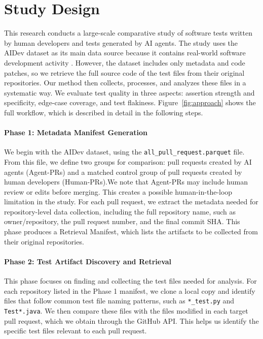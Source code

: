 \documentclass[conference]{IEEEtran}
\begin{document}
\section{Study Design}
\label{Section:Methodology} 
This research conducts a large-scale comparative study of software tests written by human developers and tests generated by AI agents. The study uses the AIDev dataset as its main data source because it contains real-world software development activity \cite{li2025riseaiteammatessoftware}. However, the dataset includes only metadata and code patches, so we retrieve the full source code of the test files from their original repositories. Our method then collects, processes, and analyzes these files in a systematic way. We evaluate test quality in three aspects: assertion strength and specificity, edge-case coverage, and test flakiness. Figure~\ref{fig:approach} shows the full workflow, which is described in detail in the following steps.

\paragraph{\textbf{Phase 1: Metadata Manifest Generation}}
We begin with the AIDev dataset, using the \texttt{all\_pull\_request.parquet} file. From this file, we define two groups for comparison: pull requests created by AI agents (Agent-PRs) and a matched control group of pull requests created by human developers (Human-PRs).We note that Agent-PRs may include human review or edits before merging. This creates a possible human-in-the-loop limitation in the study. For each pull request, we extract the metadata needed for repository-level data collection, including the full repository name, such as owner/repository, the pull request number, and the final commit SHA. This phase produces a Retrieval Manifest, which lists the artifacts to be collected from their original repositories.

\paragraph{\textbf{Phase 2: Test Artifact Discovery and Retrieval}}
This phase focuses on finding and collecting the test files needed for analysis. For each repository listed in the Phase 1 manifest, we clone a local copy and identify files that follow common test file naming patterns, such as \texttt{*\_test.py} and \texttt{Test*.java}. We then compare these files with the files modified in each target pull request, which we obtain through the GitHub API. This helps us identify the specific test files relevant to each pull request.
\end{document}
